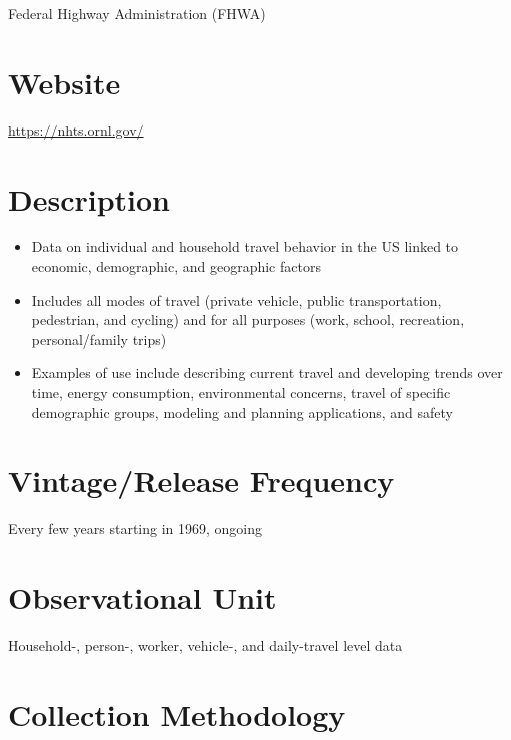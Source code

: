 \documentclass[
]{book}
\providecommand{\tightlist}{%
  \setlength{\itemsep}{0pt}\setlength{\parskip}{0pt}}
\begin{document}
Federal Highway Administration (FHWA)

\hypertarget{website-52}{%
\section{Website}\label{website-52}}

\url{https://nhts.ornl.gov/}

\hypertarget{description-52}{%
\section{Description}\label{description-52}}

\begin{itemize}
\tightlist
\item
  Data on individual and household travel behavior in the US linked to economic, demographic, and geographic factors
\item
  Includes all modes of travel (private vehicle, public transportation, pedestrian, and cycling) and for all purposes (work, school, recreation, personal/family trips)
\item
  Examples of use include describing current travel and developing trends over time, energy consumption, environmental concerns, travel of specific demographic groups, modeling and planning applications, and safety
\end{itemize}

\hypertarget{vintagerelease-frequency-52}{%
\section{Vintage/Release Frequency}\label{vintagerelease-frequency-52}}

Every few years starting in 1969, ongoing

\hypertarget{observational-unit-52}{%
\section{Observational Unit}\label{observational-unit-52}}

Household-, person-, worker, vehicle-, and daily-travel level data

\hypertarget{collection-methodology-52}{%
\section{Collection Methodology}\label{collection-methodology-52}}
\end{document}
